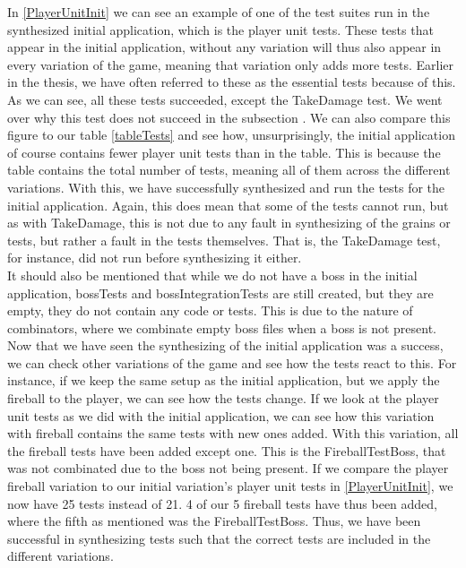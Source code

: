 In \autoref{PlayerUnitInit} we can see an example of one of the test suites run in the synthesized initial application, which is the player unit tests. These tests that appear in the initial application, without any variation will thus also appear in every variation of the game, meaning that variation only adds more tests. Earlier in the thesis, we have often referred to these as the essential tests because of this.
As we can see, all these tests succeeded, except the TakeDamage test. We went over why this test does not succeed in the subsection . We can also compare this figure to our table \autoref{tableTests} and see how, unsurprisingly, the initial application of course contains fewer player unit tests than in the table. This is because the table contains the total number of tests, meaning all of them across the different variations. With this, we have successfully synthesized and run the tests for the initial application. Again, this does mean that some of the tests cannot run, but as with TakeDamage, this is not due to any fault in synthesizing of the grains or tests, but rather a fault in the tests themselves. That is, the TakeDamage test, for instance, did not run before synthesizing it either. \\
It should also be mentioned that while we do not have a boss in the initial application, bossTests and bossIntegrationTests are still created, but they are empty, they do not contain any code or tests. This is due to the nature of combinators, where we combinate empty boss files when a boss is not present. \\
Now that we have seen the synthesizing of the initial application was a success, we can check other variations of the game and see how the tests react to this. For instance, if we keep the same setup as the initial application, but we apply the fireball to the player, we can see how the tests change. If we look at the player unit tests as we did with the initial application, we can see how this variation with fireball contains the same tests with new ones added. With this variation, all the fireball tests have been added except one. This is the FireballTestBoss, that was not combinated due to the boss not being present. If we compare the player fireball variation to our initial variation's player unit tests in \autoref{PlayerUnitInit}, we now have 25 tests instead of 21. 4 of our 5 fireball tests have thus been added, where the fifth as mentioned was the FireballTestBoss. Thus, we have been successful in synthesizing tests such that the correct tests are included in the different variations. %
